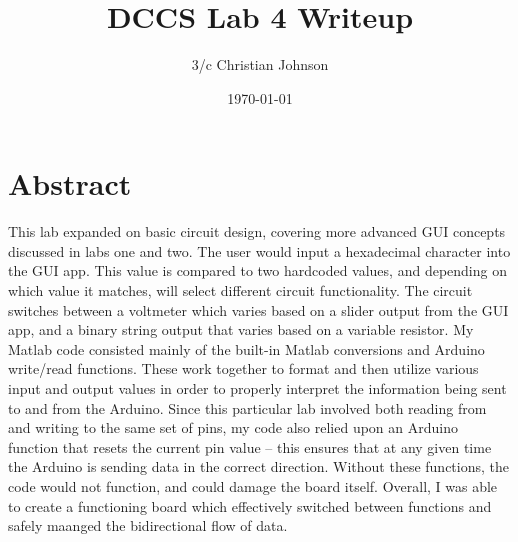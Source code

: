 \documentclass[11pt]{article}
\author{3/c Christian Johnson}
\date{\today}
\title{DCCS Lab 4 Writeup}
\begin{document}
\maketitle
\tableofcontents

\clearpage
\section{Abstract}
\label{sec:org594e886}
This lab expanded on basic circuit design, covering more advanced GUI concepts discussed in labs one and two. The user would input a hexadecimal character into the GUI app. This value is compared to two hardcoded values, and depending on which value it matches, will select different circuit functionality. The circuit switches between a voltmeter which varies based on a slider output from the GUI app, and a binary string output that varies based on a variable resistor. My Matlab code consisted mainly of the built-in Matlab conversions and Arduino write/read functions. These work together to format and then utilize various input and output values in order to properly interpret the information being sent to and from the Arduino. Since this particular lab involved both reading from and writing to the same set of pins, my code also relied upon an Arduino function that resets the current pin value – this ensures that at any given time the Arduino is sending data in the correct direction. Without these functions, the code would not function, and could damage the board itself. Overall, I was able to create a functioning board which effectively switched between functions and safely maanged the bidirectional flow of data. 
\end{document}
